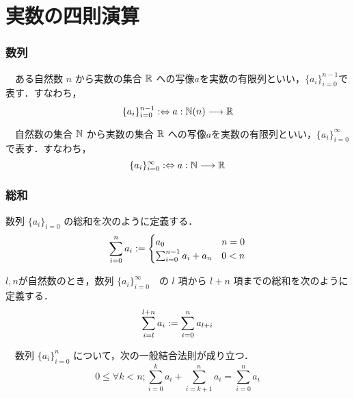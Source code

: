 \documentclass[leqno,autodetect-engine,dvipdfmx-if-dvi,ja=standard,a4paper,12pt]{bxjsbook}
\begin{document}
			\section{実数の四則演算}
					
					\subsubsection{数列}
					\begin{dfn}[有限列]　ある自然数 $n$ から実数の集合 $\mathbb{R}$ への写像$a$を実数の有限列といい，$\{ a_{i} \}_{i=0}^{n-1}$で表す．すなわち，
						\begin{equation}
							\{a_i\}_{i=0}^{n-1} :\Leftrightarrow a: \mathbb{N}(n) \longrightarrow \mathbb{R}
						\end{equation}
					\end{dfn}
					\begin{dfn}[無限列]　自然数の集合 $\mathbb{N}$ から実数の集合 $\mathbb{R}$ への写像$a$を実数の有限列といい，$\{ a_{i} \}_{i=0}^{\infty}$で表す．すなわち，
						\begin{equation}
							\{a_i\}_{i=0}^{\infty} :\Leftrightarrow a: \mathbb{N} \longrightarrow \mathbb{R}
						\end{equation}
					\end{dfn}
				
					\subsubsection{総和}
						\begin{dfn} 数列 $\{a_i\}_{i=0}$ の総和を次のように定義する．
							\begin{equation}
								\sum_{i=0}^{n} a_i := \begin{cases}
									a_0 & n = 0 \\
									\sum_{i=0}^{n-1} a_i + a_{n} &  0 < n
								\end{cases}
							\end{equation}
						\end{dfn}
					
					\begin{dfn} $l,n$が自然数のとき，数列 $\{a_i\}_{i=0}^{\infty}$　の $l$ 項から $l + n$ 項までの総和を次のように定義する．
						\begin{equation}
							\sum_{i=l}^{l+n} a_i := \sum_{i=0}^{n} a_{l+i}
						\end{equation}
					\end{dfn}
					
					\begin{thm}[結合法則]　数列 $\{a_i\}_{i=0}^{n}$ について，次の一般結合法則が成り立つ．
						\begin{equation}
							0 \le \forall k < n ; \sum_{i=0}^{k} a_i + \sum_{i=k+1}^{n} a_i = \sum_{i=0}^{n} a_i
						\end{equation} 
					\end{thm}
					
\end{document}
